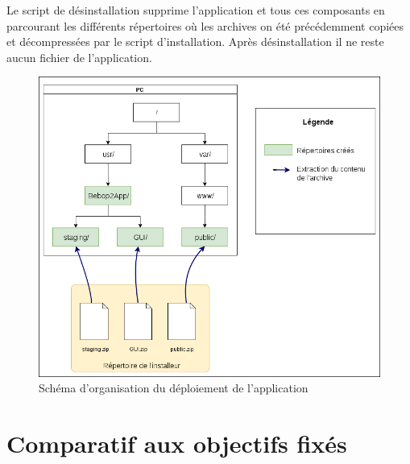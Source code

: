 \documentclass{article}
\begin{document}
Le script de désinstallation supprime l'application et tous ces composants en parcourant les différents répertoires où les archives on été précédemment copiées et décompressées par le script d'installation. Après désinstallation il ne reste aucun fichier de l'application.\\

	\begin{center}
	\begin{figure}[!h]
	\includegraphics[scale=0.4]{deploiement.png}
	\caption{Schéma d'organisation du déploiement de l'application}
	\end{figure}
    \end{center}
    
    
\newpage
\section{Comparatif aux objectifs fixés}
\end{document}
